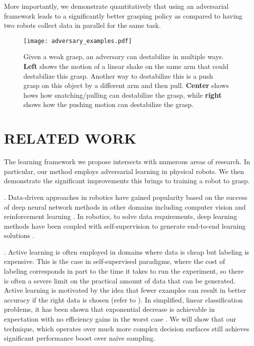 \documentclass[letterpaper, 10 pt, conference]{ieeeconf}  %
\begin{document}
More importantly, we demonstrate quantitatively that using an adversarial framework leads to a significantly better grasping policy as compared to having two robots collect data in parallel for the same task. 

\begin{figure*}[t!]
\begin{center}
\texttt{[image: adversary\_examples.pdf]}
\end{center}
\vspace{-0.1in}
\caption{Given a weak grasp, an adversary can destabilize in multiple ways. \textbf{Left} shows the motion of a linear shake on the same arm that could destabilize this grasp. Another way to destabilize this is a push grasp on this object by a different arm and then pull. \textbf{Center} shows hows how snatching/pulling can destabilize the grasp, while \textbf{right} shows how the pushing motion can destabilize the grasp.}
\vspace{-0.2in}
\label{fig:framework_fig}
\end{figure*}
\section{RELATED WORK}

The learning framework we propose intersects with numerous areas of research. In particular, our method employs adversarial learning in physical robots. We then demonstrate the significant improvements this brings to training a robot to grasp.

.
Data-driven approaches in robotics have gained popularity based on the success of deep neural network methods in other domains including computer vision \cite{krizhevsky2012imagenet} and reinforcement learning \cite{mnih2015human}.  In robotics, to solve data requirements, deep learning methods  have been coupled with self-supervision to generate end-to-end learning solutions  \cite{lenz2015deep, pinto2016supersizing, pinto2016curious, levine2016end, levine2016learning}.  

.
Active learning is often employed in domains where data is cheap but labeling is expensive. This is the case in self-supervised paradigms, where the cost of labeling corresponds in part to the time it takes to run the experiment, so there is often a severe limit on the practical amount of data that can be generated. Active learning is motivated by the idea that fewer examples can result in better accuracy if the right data is chosen (refer to \cite{settles09}). In simplified, linear classification problems, it has been shown that exponential decrease is achievable in expectation with no efficiency gains in the worst case \cite{dasgupta2004analysis}. We will show that our technique, which operates over much more complex decision surfaces still achieves significant performance boost over naive sampling.
\end{document}
